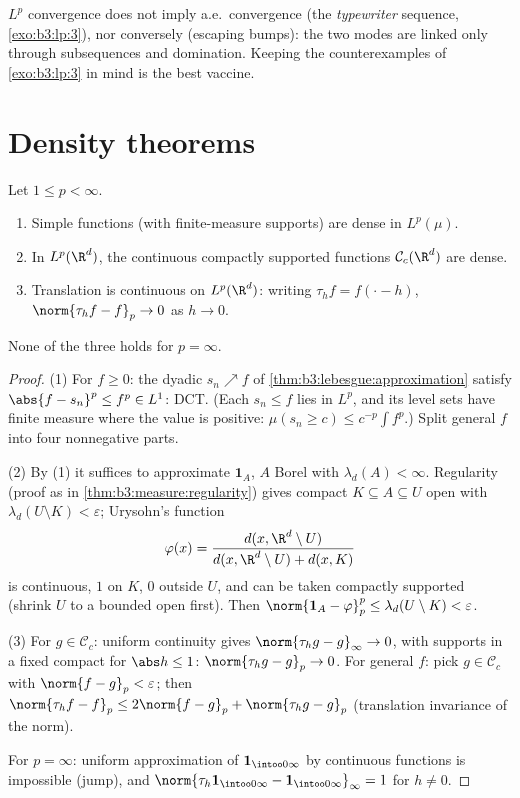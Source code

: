 \begin{remark}\label{rem:b3:lp:modes}
$L^p$ convergence does not imply a.e.\ convergence (the
\emph{typewriter} sequence, \cref{exo:b3:lp:3}), nor
conversely (escaping bumps): the two modes are linked only
through subsequences and domination. Keeping the counterexamples
of \cref{exo:b3:lp:3} in mind is the best vaccine.
\end{remark}

\section{Density theorems}

\begin{theorem}\label{thm:b3:lp:density}
Let $1 \leq p < \infty$.
\begin{enumerate}
  \item Simple functions (with finite-measure supports) are
        dense in $L^p(\mu)$.
  \item In $L^p(\R^d)$, the continuous compactly supported
        functions $\mathcal C_c(\R^d)$ are dense.
  \item Translation is continuous on $L^p(\R^d)$: writing
        $\tau_hf = f(\cdot - h)$, $\norm{\tau_hf - f}_p \to 0$
        as $h \to 0$.
\end{enumerate}
None of the three holds for $p = \infty$.
\end{theorem}

\begin{proof}
(1) For $f \geq 0$: the dyadic $s_n \nearrow f$ of
\cref{thm:b3:lebesgue:approximation} satisfy $\abs{f - s_n}^p
\leq f^p \in L^1$: DCT. (Each $s_n \leq f$ lies in $L^p$, and
its level sets have finite measure where the value is
positive: $\mu(s_n \geq c) \leq c^{-p}\int f^p$.) Split
general $f$ into four nonnegative parts.

(2) By (1) it suffices to approximate $\mathbf 1_A$, $A$ Borel
with $\lambda_d(A) < \infty$. Regularity (proof as in
\cref{thm:b3:measure:regularity}) gives compact $K \subseteq A
\subseteq U$ open with $\lambda_d(U\setminus K) <
\varepsilon$; Urysohn's function
\[
\varphi(x) = \frac{d(x, \R^d\setminus U)}{d(x, \R^d\setminus U)
+ d(x, K)}
\]
is continuous, $1$ on $K$, $0$ outside $U$, and can be taken
compactly supported (shrink $U$ to a bounded open first). Then
$\norm{\mathbf 1_A - \varphi}_p^p \leq \lambda_d(U\setminus K)
< \varepsilon$.

(3) For $g \in \mathcal C_c$: uniform continuity gives
$\norm{\tau_hg - g}_\infty \to 0$, with supports in a fixed
compact for $\abs h \leq 1$: $\norm{\tau_hg - g}_p \to 0$. For
general $f$: pick $g \in \mathcal C_c$ with $\norm{f - g}_p <
\varepsilon$; then $\norm{\tau_hf - f}_p \leq 2\norm{f - g}_p +
\norm{\tau_hg - g}_p$ (translation invariance of the norm).

For $p = \infty$: uniform approximation of $\mathbf
1_{\intoo0\infty}$ by continuous functions is impossible
(jump), and $\norm{\tau_h\mathbf 1_{\intoo0\infty} - \mathbf
1_{\intoo0\infty}}_\infty = 1$ for $h \neq 0$.
\end{proof}

